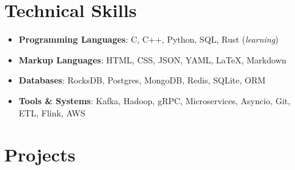 \documentclass[10pt,a4paper,calibri]{moderncv}
\newcommand{\mediumspace}{\vspace{0.6em}}
\begin{document}



\section{Technical Skills}
\begin{itemize}\setlength\itemsep{0.4em}
	\item \textbf{Programming Languages}: C, C++, Python, SQL, Rust (\textit{learning})
	\item \textbf{Markup Languages}: HTML, CSS, JSON, YAML, \LaTeX, Markdown
	\item \textbf{Databases}: RocksDB, Postgres, MongoDB, Redis, SQLite, ORM
	\item \textbf{Tools \& Systems}: Kafka, Hadoop, gRPC, Microservices, Asyncio, Git, ETL, Flink, AWS
\end{itemize}


\section{Projects}
\end{document}
